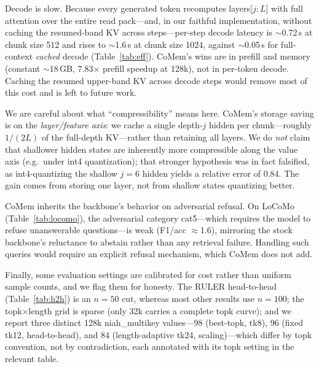 Decode is slow. Because every generated token recomputes layers[$j{:}L$]
with full attention over the entire read pack---and, in our faithful
implementation, without caching the resumed-band KV across steps---per-step
decode latency is
$\sim$0.72\,s at chunk size 512 and rises to $\sim$1.6\,s at chunk size 1024,
against $\sim$0.05\,s for full-context \emph{cached} decode (Table~\ref{tab:eff}). CoMem's
wins are in prefill and memory (constant $\sim$18\,GB, 7.83$\times$ prefill
speedup at 128k), not in per-token decode. Caching the resumed upper-band KV
across decode steps would remove most of this cost and is left to future work.

We are careful about what ``compressibility'' means here. CoMem's storage
saving is on the \emph{layer/feature axis}: we cache a single depth-$j$
hidden per chunk---roughly $1/(2L)$ of the full-depth KV---rather than
retaining all layers. We do \emph{not} claim that shallower hidden states
are inherently more compressible along the value axis (e.g.\ under int4
quantization); that stronger hypothesis was in fact falsified, as
int4-quantizing the shallow $j{=}6$ hidden yields a relative error of 0.84.
The gain comes from storing one layer, not from shallow states quantizing
better.

CoMem inherits the backbone's behavior on adversarial refusal. On LoCoMo
(Table~\ref{tab:locomo}), the adversarial category cat5---which requires the
model to refuse unanswerable questions---is weak (F1/acc $\approx$1.6),
mirroring the stock backbone's reluctance to abstain rather than any
retrieval failure. Handling such queries would require an explicit refusal
mechanism, which CoMem does not add.

Finally, some evaluation settings are calibrated for cost rather than uniform
sample counts, and we flag them for honesty. The RULER head-to-head
(Table~\ref{tab:h2h}) is an $n{=}50$ cut, whereas most other results use
$n{=}100$; the topk$\times$length grid is sparse (only 32k carries a complete
topk curve); and we report three distinct 128k niah\_multikey values---98
(best-topk, tk8), 96 (fixed tk12, head-to-head), and 84 (length-adaptive
tk24, scaling)---which differ by topk convention, not by contradiction, each
annotated with its topk setting in the relevant table.

